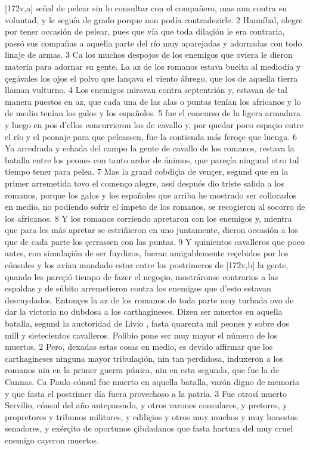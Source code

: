 \documentclass[11pt,twoside]{article}\makeatletter
\def\persName{}\def\name{}
\begin{document}
[172v,a] señal de pelear sin lo consultar con el compañero, mas aun contra su voluntad, y le seguía de grado porque non podía contradezirle. 2  {\persName Hanníbal}, alegre por tener occasión de pelear, pues que vía que toda dilaçión le era contraria, passó sus compañas a aquella parte del río muy aparejadas y adornadas con todo linaje de armas. 3 Ca los muchos despojos de los enemigos que oviera le dieron materia para adornar su gente. La az de los romanos estava buelta al mediodía y çegávales los ojos el polvo que lançava el viento ábrego, que los de aquella tierra llaman vulturno. 4 Los enemigos miravan contra septentrión y, estavan de tal manera puestos en az, que cada una de las alas o puntas tenían los africanos y lo de medio tenían los galos y los españoles. 5  fue el concurso de la ligera armadura y luego en pos d’ellos concurrieron los de cavallo y, por quedar poco espaçio entre el río y el peonaje para que peleassen, fue la contienda más feroçe que luenga. 6 Ya arredrada y echada del campo la gente de cavallo de los romanos, restava la batalla entre los peones con tanto ardor de ánimos, que pareçía ningund otro tal tiempo tener para pelea. 7 Mas la grand cobdiçia de vençer, segund que en la primer arremetida tovo el començo alegre, assí después dio triste salida a los romanos, porque los galos y los españoles que arriba he mostrado ser collocados en medio, no podiendo sofrir el ímpeto de los romanos, se recogieron al socorro de los africanos. 8 Y los romanos corriendo apretaron con los enemigos y, mientra que para les más apretar se estriñieron en uno juntamente, dieron occasión a los  {\name {}} que de cada parte los çerrassen con las puntas. 9 Y quinientos cavalleros que poco antes, con simulaçión de ser fuydizos, fueran amigablemente reçebidos por los cónsules y los avían mandado estar entre los postrimeros de %
[172v,b] la gente, quando les pareçió tiempo de fazer el negoçio, mostráronse contrarios a las espaldas y de súbito arremetieron contra los enemigos que d’esto estavan descuydados. Entonçes la az de los romanos de toda parte muy turbada ovo de dar la victoria no dubdosa a los  {\name carthagineses}.
\pend
{} Dizen ser muertos en aquella batalla, segund la auctoridad de  {\persName Livio} , fasta quarenta mil peones y sobre dos mill y sietecientos cavalleros. Polibio pone ser muy mayor el número de los muertos. 2 Pero, dexadas estas cosas en medio, es devido affirmar que los  {\name carthagineses} ninguna mayor tribulaçión, nin tan perdidosa, induxeron a los romanos nin en la primer guerra púnica, nin en esta segunda, que fue la de Cannas. Ca Paulo cónsul fue muerto en aquella batalla, varón digno de memoria y que fasta el postrimer día fuera provechoso a la patria. 3 Fue otrosí muerto Servilio, cónsul del año antepassado, y otros varones consulares, y pretores, y propretores y tribunos militares, y ediliçios y otros muy muchos y muy honestos senadores, y exérçito de oportunos çibdadanos que fasta hartura del muy cruel enemigo cayeron muertos.
\end{document}
